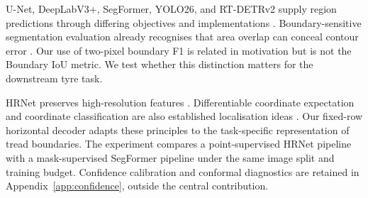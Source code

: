 U-Net, DeepLabV3+, SegFormer, YOLO26, and RT-DETRv2 supply region predictions through differing objectives and implementations \cite{unet,deeplab,segformer,yolo,rtdetr}. Boundary-sensitive segmentation evaluation already recognises that area overlap can conceal contour error \cite{boundaryiou}. Our use of two-pixel boundary F1 is related in motivation but is not the Boundary IoU metric. We test whether this distinction matters for the downstream tyre task.

HRNet preserves high-resolution features \cite{hrnet}. Differentiable coordinate expectation and coordinate classification are also established localisation ideas \cite{dsnt,simcc}. Our fixed-row horizontal decoder adapts these principles to the task-specific representation of tread boundaries. The experiment compares a point-supervised HRNet pipeline with a mask-supervised SegFormer pipeline under the same image split and training budget. Confidence calibration and conformal diagnostics \cite{calibration,conformal} are retained in Appendix~\ref{app:confidence}, outside the central contribution.

